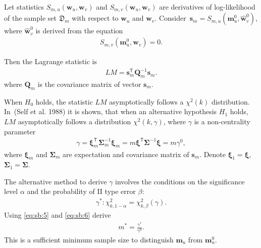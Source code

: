 \documentclass[
11pt,%
tightenlines,%
twoside,%
onecolumn,%
nofloats,%
nobibnotes,%
nofootinbib,%
superscriptaddress,%
noshowpacs,%
centertags]%
{revtex4}
\begin{document}
Let statistics $S_{m,u}\left(\textbf{w}_{u}, \textbf{w}_{v}\right)$ and $S_{m,v}\left(\textbf{w}_{u}, \textbf{w}_{v}\right)$ are derivatives of log-likelihood of the sample set $\mathfrak{D}_{m}$ with respect to $\textbf{w}_{u}$ and $\textbf{w}_{v}$.
Consider~$\textbf{s}_{m} = S_{m,u}\left(\textbf{m}^{0}_{u}, \hat{\textbf{w}}^{0}_{v}\right)$, where $\hat{\textbf{w}}^{0}_{v}$ is derived from the equation
\begin{equation}
\label{eq:sb:3}
\begin{aligned}
	S_{m,v}\left(\textbf{m}^{0}_{u}, \textbf{w}_{v}\right) = 0.
\end{aligned}
\end{equation}

Then the Lagrange statistic is
\begin{equation}
\label{eq:sb:4}
\begin{aligned}
	LM = \textbf{s}^{\mathsf{T}}_{m}\textbf{Q}_{m}^{-1}\textbf{s}_{m}.
\end{aligned}
\end{equation}
where $\textbf{Q}_{m}$ is the covariance matrix of vector $\textbf{s}_{m}$.
	
When $H_0$ holds, the statistic $LM$ asymptotically follows a $\chi^2(k)$ distribution.  In~(Self et al. 1988) it is shown, that when an alternative hypothesis $H_1$ holds,  $LM$ asymptotically follows a distribution $\chi^2(k,\gamma)$, where $\gamma$ is a non-centrality parameter
\begin{equation}
\label{eq:sb:5}
\begin{aligned}
	\gamma = \bm{\xi}_{m}^{\mathsf{T}}\bm{\Sigma}^{-1}_{m}\bm{\xi}_{m} = m\bm{\xi}^{\mathsf{T}}\bm{\Sigma}^{-1}\bm{\xi}= m\gamma^0,
\end{aligned}
\end{equation}
where $\bm{\xi}_{m}$ and $\bm{\Sigma}_{m}$ are expectation and covariance matrix of $\textbf{s}_{m}$. Denote $\bm{\xi}_1 = \bm{\xi}$,  $\bm{\Sigma}_1 = \bm{\Sigma}$. 
	
The alternative method to derive $\gamma$ involves the conditions on the significance level $\alpha$ and the probability of II type error $\beta$:
\begin{equation}
\label{eq:sb:6}
\begin{aligned}
	\gamma^*:\chi^2_{k, 1-\alpha} = \chi^2_{k, \beta}\left(\gamma\right).
\end{aligned}
\end{equation}
Using \eqref{eq:sb:5} and \eqref{eq:sb:6} derive
\begin{equation}
\label{eq:sb:7}
\begin{aligned}
	m^* = \frac{\gamma^*}{\gamma^0}.
\end{aligned}
\end{equation}
This is a sufficient minimum sample size to distinguish $\textbf{m}_{u}$ from $\textbf{m}^0_{u}$.
\end{document}

